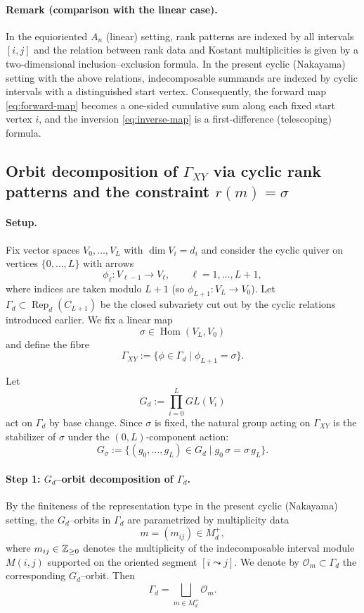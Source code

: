 \documentclass{article}
\newcommand{\Hom}{\operatorname{Hom}}
\newcommand{\Rep}{\operatorname{Rep}}
\theoremstyle{definition}
\begin{document}
\paragraph{Remark (comparison with the linear case).}
In the equioriented $A_n$ (linear) setting, rank patterns are indexed by all
intervals $[i,j]$ and the relation between rank data and Kostant multiplicities
is given by a two-dimensional inclusion--exclusion formula.
In the present cyclic (Nakayama) setting with the above relations, indecomposable
summands are indexed by cyclic intervals with a distinguished start vertex.
Consequently, the forward map \eqref{eq:forward-map} becomes a one-sided
cumulative sum along each fixed start vertex $i$, and the inversion
\eqref{eq:inverse-map} is a first-difference (telescoping) formula.
\subsection{Orbit decomposition of $\Gamma_{XY}$ via cyclic rank patterns and the constraint $r(m)=\sigma$}

\paragraph{Setup.}
Fix vector spaces $V_0,\dots,V_L$ with $\dim V_i=d_i$ and consider the cyclic quiver on
vertices $\{0,\dots,L\}$ with arrows
\[
\phi_\ell:V_{\ell-1}\longrightarrow V_\ell,\qquad \ell=1,\dots,L+1,
\]
where indices are taken modulo $L+1$ (so $\phi_{L+1}:V_L\to V_0$). Let $\Gamma_d\subset \Rep_d(C_{L+1})$
be the closed subvariety cut out by the cyclic relations introduced earlier.
We fix a linear map
\[
\sigma \in \Hom(V_L,V_0)
\]
and define the fibre
\[
\Gamma_{XY}:=\{\phi\in \Gamma_d \mid \phi_{L+1}=\sigma\}.
\]

Let
\[
G_d:=\prod_{i=0}^L GL(V_i)
\]
act on $\Gamma_d$ by base change. Since $\sigma$ is fixed, the natural group acting on
$\Gamma_{XY}$ is the stabilizer of $\sigma$ under the $(0,L)$-component action:
\[
G_\sigma:=\{(g_0,\dots,g_L)\in G_d \mid g_0\,\sigma=\sigma\, g_L\}.
\]

\paragraph{Step 1: $G_d$--orbit decomposition of $\Gamma_d$.}
By the finiteness of the representation type in the present cyclic (Nakayama) setting,
the $G_d$--orbits in $\Gamma_d$ are parametrized by multiplicity data
\[
m=(m_{ij})\in M_d^+,
\]
where $m_{ij}\in\Bbb Z_{\ge 0}$ denotes the multiplicity of the indecomposable interval
module $M(i,j)$ supported on the oriented segment $[i\leadsto j]$.
We denote by $\mathcal O_m\subset \Gamma_d$ the corresponding $G_d$--orbit. Then
\begin{equation}\label{eq:Gamma_d_orbit_decomp}
\Gamma_d=\bigsqcup_{m\in M_d^+}\mathcal O_m.
\end{equation}
\end{document}

